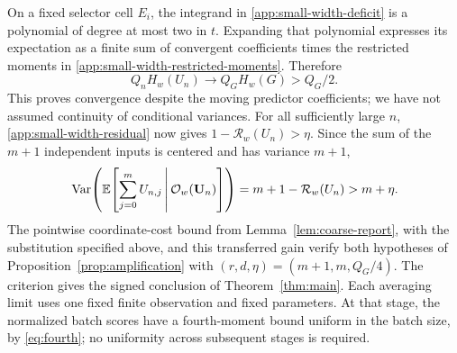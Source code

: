 On a fixed selector cell $E_i$, the integrand in
\eqref{app:small-width-deficit} is a polynomial of degree at most two
in $t$. Expanding that polynomial expresses its expectation as a
finite sum of convergent coefficients times the restricted moments
in \eqref{app:small-width-restricted-moments}.  Therefore
\[
 Q_nH_w(U_n)\longrightarrow Q_GH_w(G)>Q_G/2.
\]
This proves convergence despite the moving predictor coefficients;
we have not assumed continuity of conditional variances.
For all sufficiently large $n$, \eqref{app:small-width-residual}
now gives $1-\mathcal R_w(U_n)>\eta$.  Since the sum of the
$m+1$ independent inputs is centered and has variance $m+1$,
\[
 \operatorname{Var}\!\left(\mathbb E\!\left[\sum_{j=0}^mU_{n,j}
                  \,\middle|\,\mathcal O_w(\mathbf U_n)\right]\right)
 =m+1-\mathcal R_w(U_n)>m+\eta.
\]
The pointwise coordinate-cost bound from
Lemma~\ref{lem:coarse-report}, with the substitution specified above,
and this transferred gain verify both hypotheses of
Proposition~\ref{prop:amplification} with
$(r,d,\eta)=(m+1,m,Q_G/4)$. The criterion gives the signed
conclusion of Theorem~\ref{thm:main}. Each averaging limit uses one
fixed finite observation and fixed parameters.  At that stage, the normalized
batch scores have a fourth-moment bound uniform in the batch size,
by \eqref{eq:fourth}; no uniformity across subsequent stages is required.
